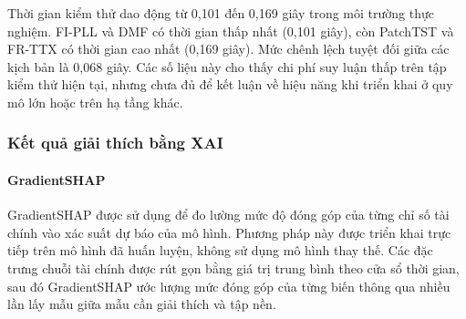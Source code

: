 \documentclass[10pt,twoside]{article}
\begin{document}
Thời gian kiểm thử dao động từ 0,101 đến 0,169 giây trong môi trường thực nghiệm. FI-PLL và DMF có thời gian thấp nhất (0,101 giây), còn PatchTST và FR-TTX có thời gian cao nhất (0,169 giây). Mức chênh lệch tuyệt đối giữa các kịch bản là 0,068 giây. Các số liệu này cho thấy chi phí suy luận thấp trên tập kiểm thử hiện tại, nhưng chưa đủ để kết luận về hiệu năng khi triển khai ở quy mô lớn hoặc trên hạ tầng khác.

\subsubsection{Kết quả giải thích bằng XAI}
\paragraph{GradientSHAP}
GradientSHAP được sử dụng để đo lường mức độ đóng góp của từng chỉ số tài chính vào xác suất dự báo của mô hình. Phương pháp này được triển khai trực tiếp trên mô hình đã huấn luyện, không sử dụng mô hình thay thế. Các đặc trưng chuỗi tài chính được rút gọn bằng giá trị trung bình theo cửa sổ thời gian, sau đó GradientSHAP ước lượng mức đóng góp của từng biến thông qua nhiều lần lấy mẫu giữa mẫu cần giải thích và tập nền.
\end{document}

